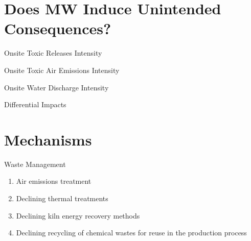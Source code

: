 \documentclass[aspectratio = 169]{beamer}
\begin{document}
    \section{Does MW Induce Unintended Consequences?}\label{sec:consequences}
    \begin{frame}{Onsite Toxic Releases Intensity}
        
        \hypertarget{Toxic Releases Intensity}{}
        \hyperlink{tab:toxic-releases-intensity}{}
    \end{frame}

    \begin{frame}[shrink = 10]{Onsite Toxic Air Emissions Intensity}
        
        \hypertarget{Toxic Air Emissions Intensity}{}
        \hyperlink{tab:toxic-air-emissions-intensity}{}
    \end{frame}

    \begin{frame}[shrink = 20]{Onsite Water Discharge Intensity}
        
        \hypertarget{Toxic Water Discharge Intensity}{}
        \hyperlink{tab:toxic-water-discharge-intensity}{}
    \end{frame}

    \begin{frame}[shrink = 30]{Differential Impacts}
        
        \hypertarget{Onsite Releases Intensities}{}
        \hyperlink{fig:heterogeneous-onsite-releases-int-heis}{}
    \end{frame}


    \section{Mechanisms}\label{sec:mechanisms}
    \begin{frame}{Waste Management}
        \begin{enumerate}
            \item Air emissions treatment
            \item Declining thermal treatments
            \item Declining kiln energy recovery methods
            \item Declining recycling of chemical wastes for reuse in the production process
        \end{enumerate}
        \hypertarget{Mechanism Waste Management}{}
        \hyperlink{tab:mechanism-waste-management}{}
    \end{frame}
\end{document}

